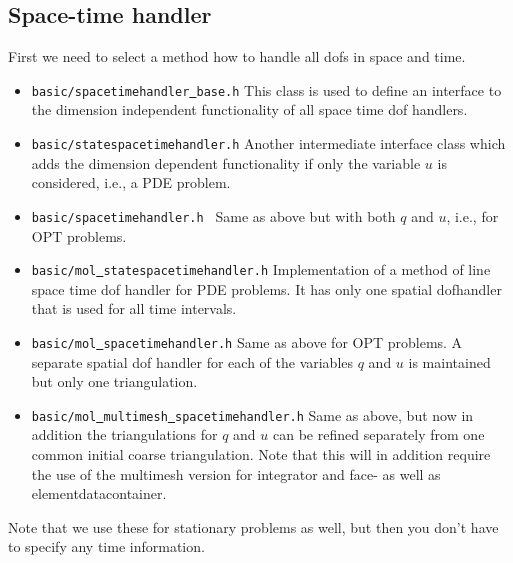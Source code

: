\subsection{Space-time handler}
First we need to select a method how to handle all dofs in space and time.
\begin{itemize}
\item \texttt{basic/spacetimehandler\underline{ }base.h} This class is used to define 
  an interface to the dimension independent functionality of all space time dof handlers.
\item \texttt{basic/statespacetimehandler.h} Another intermediate interface class which adds 
  the dimension dependent functionality if only the variable $u$ is considered, i.e., a 
  PDE problem.
\item \texttt{basic/spacetimehandler.h } Same as above but with both $q$ and $u$, i.e., for
  OPT problems.
\item \texttt{basic/mol\underline{ }statespacetimehandler.h} Implementation of a method of 
  line space time dof handler for PDE problems. It has only one spatial 
  dofhandler that is used for all time intervals.
\item \texttt{basic/mol\underline{ }spacetimehandler.h} Same as above for OPT problems.
  A separate spatial dof handler for each of the variables $q$ and $u$ is maintained 
  but only one triangulation.
\item \texttt{basic/mol\underline{ }multimesh\underline{ }spacetimehandler.h}
  Same as above, but now in addition the triangulations for $q$ and $u$ can be refined
  separately from one common initial coarse triangulation. Note that this will
  in addition require the use of the multimesh version for integrator and 
  face- as well as elementdatacontainer.
\end{itemize}
Note that we use these for stationary problems as well, but then you don't have to specify
any time information.

